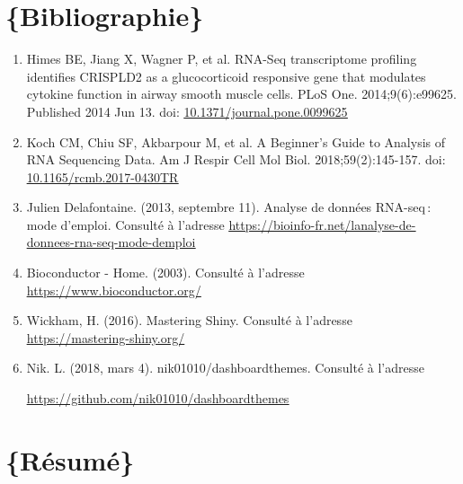 \documentclass[
  12pt,
]{article}
\begin{document}
\newpage

\hypertarget{bibliographie}{%
\section{\texorpdfstring{\Large\{Bibliographie\}}{\{Bibliographie\}}}\label{bibliographie}}

\begin{enumerate}
\item Himes BE, Jiang X, Wagner P, et al. RNA-Seq transcriptome profiling identifies CRISPLD2 as a glucocorticoid responsive gene that modulates cytokine function in airway smooth muscle cells. PLoS One. 2014;9(6):e99625. Published 2014 Jun 13. doi: \href{https://journals.plos.org/plosone/article?id=10.1371/journal.pone.0099625}{\underline{10.1371/journal.pone.0099625}}

\item Koch CM, Chiu SF, Akbarpour M, et al. A Beginner's Guide to Analysis of RNA Sequencing Data. Am J Respir Cell Mol Biol. 2018;59(2):145-157. doi: \href{https://www.atsjournals.org/doi/10.1165/rcmb.2017-0430TR}{\underline{10.1165/rcmb.2017-0430TR}}

\item Julien Delafontaine. (2013, septembre 11). Analyse de données RNA-seq : mode d’emploi. Consulté à l’adresse \href{https://bioinfo-fr.net/lanalyse-de-donnees-rna-seq-mode-demploi}{\underline{https://bioinfo-fr.net/lanalyse-de-donnees-rna-seq-mode-demploi}}

\item Bioconductor - Home. (2003). Consulté à l’adresse \href{https://www.bioconductor.org/}{\underline{https://www.bioconductor.org/}}


\item Wickham, H. (2016). Mastering Shiny. Consulté à l’adresse \href{https://mastering-shiny.org/}{\underline{https://mastering-shiny.org/}} 

\item Nik. L. (2018, mars 4). nik01010/dashboardthemes. Consulté à l’adresse
\par
\href{https://github.com/nik01010/dashboardthemes}{\underline{https://github.com/nik01010/dashboardthemes}}
\end{enumerate}
\newpage

\hypertarget{ruxe9sumuxe9}{%
\section{\texorpdfstring{\Large\{Résumé\}}{\{Résumé\}}}\label{ruxe9sumuxe9}}
\end{document}
